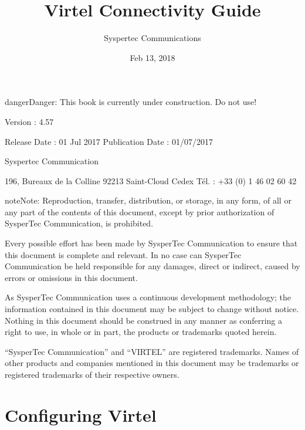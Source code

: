 \documentclass[letterpaper,10pt,english]{sphinxmanual}
\title{Virtel Connectivity Guide}
\date{Feb 13, 2018}
\author{Syspertec Communications}
\begin{document}
\maketitle
\sphinxtableofcontents
{}\label{\detokenize{connectivity_guide::doc}}




\begin{sphinxadmonition}{danger}{Danger:}
This book is currently under construction. Do not use!
\end{sphinxadmonition}

Version : 4.57

Release Date : 01 Jul 2017 Publication Date : 01/07/2017

Syspertec Communication

196, Bureaux de la Colline 92213 Saint-Cloud Cedex Tél. : +33 (0) 1 46 02 60 42


\begin{sphinxadmonition}{note}{Note:}
Reproduction, transfer, distribution, or storage, in any form, of all or any part of
the contents of this document, except by prior authorization of SysperTec
Communication, is prohibited.

Every possible effort has been made by SysperTec Communication to ensure that this document
is complete and relevant. In no case can SysperTec Communication be held responsible for
any damages, direct or indirect, caused by errors or omissions in this document.

As SysperTec Communication uses a continuous development methodology; the information
contained in this document may be subject to change without notice. Nothing in this
document should be construed in any manner as conferring a right to use, in whole or in
part, the products or trademarks quoted herein.

“SysperTec Communication” and “VIRTEL” are registered trademarks. Names of other products
and companies mentioned in this document may be trademarks or registered trademarks of
their respective owners.
\end{sphinxadmonition}


\chapter{Configuring Virtel}
\label{\detokenize{connectivity_guide:v457cn-introduction}}\label{\detokenize{connectivity_guide:configuring-virtel}}\label{\detokenize{connectivity_guide:connectivity-reference-v4-57}}\label{\detokenize{connectivity_guide:virtel457cn}}
\end{document}
